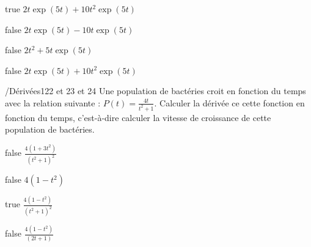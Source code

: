             \begin{reponses}
            	\item[true]   $2t\exp(5t)+10t^{2}\exp(5t)$ 
            	\item[false]  $2t\exp(5t)-10t\exp(5t) $ 
                \item[false]  $2t^{2}+5t\exp(5t) $ 
                \item[false]  $2t\exp(5t)+10t^{2}\exp(5t) $ 
            \end{reponses}
			\begin{question}{/}{Dérivées}{1}{22 et 23 et 24}
				Une population de bactéries croit en fonction du temps avec la relation suivante : $P(t) = \frac{4t}{t^{2}+1}$. Calculer la dérivée ce cette fonction en fonction du temps, c'est-à-dire calculer la vitesse de croissance de cette population de bactéries.
            \end{question}
            \begin{reponses}
            	\item[false] $\frac{4(1+3t^{2})}{(t^{2}+1)^{2}}$
            	\item[false]  $ 4(1-t^{2})$
                \item[true]  $\frac{4(1-t^{2})}{(t^{2}+1)^{2}}$
                \item[false] $ \frac{4(1-t^{2})}{(2t+1)}$
            \end{reponses}
